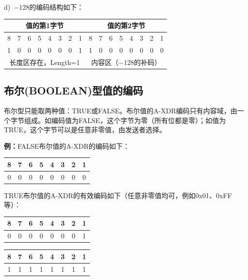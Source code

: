 \documentclass[a4paper,11pt]{ctexart}
\begin{document}
d)~$-128$的编码结构如下：

\begin{center}
\begin{tabular}{|c|c|c|c|c|c|c|c||c|c|c|c|c|c|c|c|}
\hline
\multicolumn{8}{|c|}{值的第1字节} & \multicolumn{8}{|c|}{值的第2字节} \\
\hline
8 & 7 & 6 & 5 & 4 & 3 & 2 & 1 & 8 & 7 & 6 & 5 & 4 & 3 & 2 & 1 \\
\hline
1 & 0 & 0 & 0 & 0 & 0 & 0 & 1 & 1 & 0 & 0 & 0 & 0 & 0 & 0 & 0 \\
\hline
\multicolumn{8}{|c|}{长度区存在，Length=1} & \multicolumn{8}{|c|}{内容区（$-128$的补码）} \\
\hline
\end{tabular}
\end{center}

\subsection{布尔(BOOLEAN)型值的编码}

布尔型只能取两种值：TRUE或FALSE。布尔值的A-XDR编码只有内容域，由一个字节组成。如编码值为FALSE，这个字节为零（所有位都是零）；如值为TRUE，这个字节可以是任意非零值，由发送者选择。

\noindent\textbf{例：}FALSE布尔值的A-XDR的编码如下：

\begin{center}
\begin{tabular}{|c|c|c|c|c|c|c|c|}
\hline
8 & 7 & 6 & 5 & 4 & 3 & 2 & 1 \\
\hline
0 & 0 & 0 & 0 & 0 & 0 & 0 & 0 \\
\hline
\end{tabular}
\end{center}

TRUE布尔值的A-XDR的有效编码如下（任意非零值均可，例如0x01、0xFF等）：

\begin{center}
\begin{tabular}{|c|c|c|c|c|c|c|c|}
\hline
8 & 7 & 6 & 5 & 4 & 3 & 2 & 1 \\
\hline
0 & 0 & 0 & 0 & 0 & 0 & 0 & 1 \\
\hline
\end{tabular}
\qquad
\begin{tabular}{|c|c|c|c|c|c|c|c|}
\hline
8 & 7 & 6 & 5 & 4 & 3 & 2 & 1 \\
\hline
1 & 1 & 1 & 1 & 1 & 1 & 1 & 1 \\
\hline
\end{tabular}
\end{center}
\end{document}
